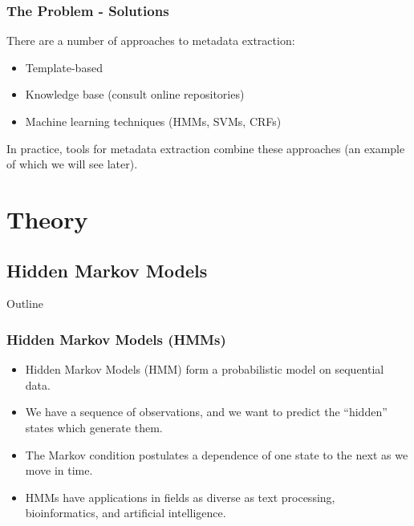 \documentclass{beamer}
\begin{document}

\begin{frame}
\frametitle{The Problem - Solutions}
There are a number of approaches to metadata extraction:
\begin{itemize}
\item Template-based
\item Knowledge base (consult online repositories)
\item Machine learning techniques (HMMs, SVMs, CRFs)
\end{itemize}
In practice, tools for metadata extraction combine these approaches (an example of which we will see later). %
\end{frame}


\section{Theory}
\subsection{Hidden Markov Models}


\begin{frame}[noframenumbering]{Outline}
\tableofcontents[currentsubsection]
\end{frame}


\begin{frame}
\frametitle{Hidden Markov Models (HMMs)}
\begin{itemize}
\item Hidden Markov Models (HMM) form a probabilistic model on sequential data.
\item We have a sequence of observations, and we want to predict the ``hidden'' states which generate them.
\item The Markov condition postulates a dependence of one state to the next as we move in time.
\item HMMs have applications in fields as diverse as text processing, bioinformatics, and artificial intelligence.
\end{itemize}
\end{frame}

\end{document}
